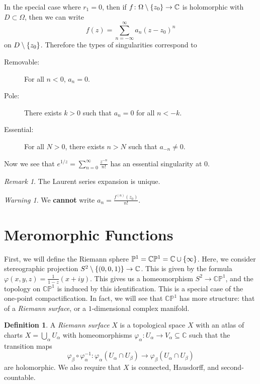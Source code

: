 \documentclass[leqno, openany]{memoir}
\theoremstyle{definition}
\newtheorem{defn}[thm]{Definition}
\theoremstyle{remark}
\newtheorem{rmk}[thm]{Remark}
\newtheorem{warn}[thm]{Warning}
\theoremstyle{plain}
\theoremstyle{definition}
\theoremstyle{remark}
\newcommand{\C}{\mathbb{C}}
\renewcommand{\P}{\mathbb{P}}
\begin{document}
In the special case where $r_1 = 0$, then if $f \colon \Omega \setminus \qty{z_0} \to \C$ is holomorphic with $D \subset \Omega$, then we can write
\[ f(z) = \sum_{n=-\infty}^{\infty} a_n {(z-z_0)}^n \]
on $D \setminus \qty{z_0}$. Therefore the types of singularities correspond to
\begin{description}
    \item[Removable:] For all $n < 0$, $a_n = 0$.
    \item[Pole:] There exists $k > 0$ such that $a_n = 0$ for all $n < -k$.
    \item[Essential:] For all $N > 0$, there exists $n > N$ such that $a_{-n} \neq 0$.
\end{description}
Now we see that $e^{1/z} = \sum_{n=0}^{\infty} \frac{z^{-n}}{n!}$ has an essential singularity at $0$.

\begin{rmk}
    The Laurent series expansion is unique.
\end{rmk}

\begin{warn}
    We \textbf{cannot} write $a_n = \frac{f^{(n)}(z_0)}{n!}$.
\end{warn}

\section{Meromorphic Functions}%
\label{sec:meromorphic_functions}

First, we will define the Riemann sphere $\P^1 = \C\P^1 = \C \cup \qty{\infty}$. Here, we consider stereographic projection $S^2 \setminus \qty{(0,0,1)} \to \C$. This is given by the formula $\varphi(x,y,z) = \frac{1}{1-z} (x+iy)$. This gives us a homeomorphism $S^2 \to \C\P^1$, and the topology on $\C\P^1$ is induced by this identification. This is a special case of the one-point compactification. In fact, we will see that $\C\P^1$ has more structure: that of a \textit{Riemann surface}, or a $1$-dimensional complex manifold.

\begin{defn}
    A \textit{Riemann surface} $X$ is a topological space $X$ with an atlas of charts $X = \bigcup_{\alpha} U_{\alpha}$ with homeomorphisms $\varphi_{\alpha} \colon U_{\alpha} \to V_{\alpha} \subseteq \C$ such that the transition maps 
    \[ \varphi_{\beta} \circ \varphi_{\alpha}^{-1} \colon \varphi_{\alpha}(U_{\alpha} \cap U_{\beta}) \to \varphi_{\beta}(U_{\alpha} \cap U_{\beta}) \] 
    are holomorphic. We also require that $X$ is connected, Hausdorff, and second-countable.
\end{defn}
\end{document}
